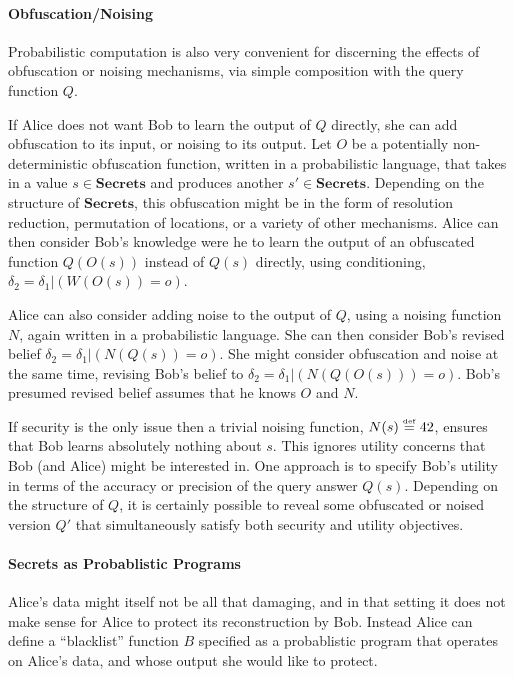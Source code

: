 \documentclass{article} %
\newcommand{\secrets}[0]{\textbf{Secrets}}
\newcommand{\asecret}[0]{s}
\newcommand{\rsecret}[0]{s}
\newcommand{\paren}[1]{\left( #1 \right)}
\newcommand{\cond}[0]{|}
\newcommand{\stacklabel}[1]{\stackrel{\smash{\scriptscriptstyle \mathrm{#1}}}}
\newcommand{\defeq}{\stacklabel{def}=}
\theoremstyle{plain} %
\theoremstyle{definition} %
\begin{document}
\paragraph*{Obfuscation/Noising} Probabilistic computation is also very
convenient for discerning the effects of obfuscation or noising
mechanisms, via simple composition with the query function $ Q $.

If Alice does not want Bob to learn the output of $ Q $ directly, she
can add obfuscation to its input, or noising to its output. Let $ O $
be a potentially non-deterministic obfuscation function, written in a
probabilistic language, that takes in a value $ \asecret \in \secrets
$ and produces another $ \asecret' \in \secrets $. Depending on the
structure of $ \secrets $, this obfuscation might be in the form of
resolution reduction, permutation of locations, or a variety of other
mechanisms. Alice can then consider Bob's knowledge were he to learn
the output of an obfuscated function $ Q(O(\rsecret)) $ instead of $
Q(\rsecret) $ directly, using conditioning, $ \delta_2 = \delta_1
\cond \paren{W(O(\rsecret)) = o} $.

Alice can also consider adding noise to the output of $ Q $, using a
noising function $ N $, again written in a probabilistic language. She
can then consider Bob's revised belief $ \delta_2 = \delta_1 \cond
\paren{N(Q(\rsecret)) = o} $. She might consider obfuscation and noise
at the same time, revising Bob's belief to $ \delta_2 = \delta_1 \cond
\paren{N(Q(O(\rsecret))) = o} $. Bob's presumed revised belief assumes
that he knows $ O $ and $ N $.

If security is the only issue
then a trivial noising function, $ N(\rsecret) \defeq 42 $, ensures
that Bob learns absolutely nothing about $ \rsecret $.
This ignores utility concerns that Bob (and Alice) might be
interested in. One approach is to specify Bob's utility in terms of
the accuracy or precision of the query answer $ Q(\rsecret) $.
Depending on the structure of $ Q $, it is certainly
possible to reveal some obfuscated or noised version $Q'$ that simultaneously
satisfy both security and utility objectives.

\paragraph*{Secrets as Probablistic Programs}

Alice's data might itself not be all that damaging, and in that setting
it does not make sense for Alice to protect its reconstruction by Bob. Instead
Alice can define a ``blacklist'' function $ B $ specified as a probablistic
program that operates on Alice's data, and whose output she would like to protect.
\end{document}
